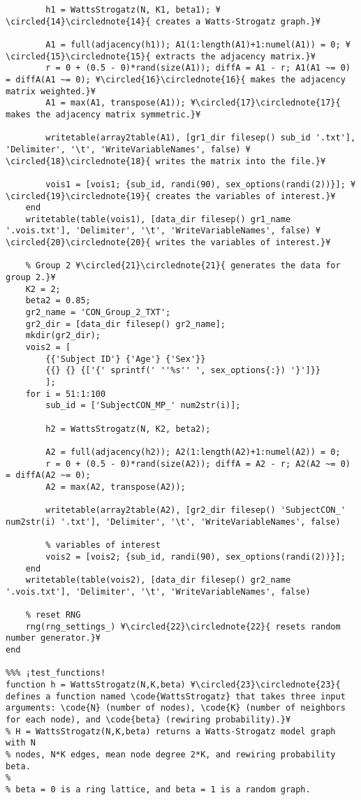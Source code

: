 \documentclass{tufte-handout}
\begin{document}
\begin{lstlisting}
        h1 = WattsStrogatz(N, K1, beta1); ¥\circled{14}\circlednote{14}{ creates a Watts-Strogatz graph.}¥  

        A1 = full(adjacency(h1)); A1(1:length(A1)+1:numel(A1)) = 0; ¥\circled{15}\circlednote{15}{ extracts the adjacency matrix.}¥ 
        r = 0 + (0.5 - 0)*rand(size(A1)); diffA = A1 - r; A1(A1 ~= 0) = diffA(A1 ~= 0); ¥\circled{16}\circlednote{16}{ makes the adjacency matrix weighted.}¥
        A1 = max(A1, transpose(A1)); ¥\circled{17}\circlednote{17}{ makes the adjacency matrix symmetric.}¥

        writetable(array2table(A1), [gr1_dir filesep() sub_id '.txt'], 'Delimiter', '\t', 'WriteVariableNames', false) ¥\circled{18}\circlednote{18}{ writes the matrix into the file.}¥

        vois1 = [vois1; {sub_id, randi(90), sex_options(randi(2))}]; ¥\circled{19}\circlednote{19}{ creates the variables of interest.}¥
    end
    writetable(table(vois1), [data_dir filesep() gr1_name '.vois.txt'], 'Delimiter', '\t', 'WriteVariableNames', false) ¥\circled{20}\circlednote{20}{ writes the variables of interest.}¥

    % Group 2 ¥\circled{21}\circlednote{21}{ generates the data for group 2.}¥  
    K2 = 2; 
    beta2 = 0.85;
    gr2_name = 'CON_Group_2_TXT';
    gr2_dir = [data_dir filesep() gr2_name];
    mkdir(gr2_dir);
    vois2 = [
        {{'Subject ID'} {'Age'} {'Sex'}}
        {{} {} {['{' sprintf(' ''%s'' ', sex_options{:}) '}']}}
        ];
    for i = 51:1:100
        sub_id = ['SubjectCON_MP_' num2str(i)];

        h2 = WattsStrogatz(N, K2, beta2);

        A2 = full(adjacency(h2)); A2(1:length(A2)+1:numel(A2)) = 0;
        r = 0 + (0.5 - 0)*rand(size(A2)); diffA = A2 - r; A2(A2 ~= 0) = diffA(A2 ~= 0);
        A2 = max(A2, transpose(A2));

        writetable(array2table(A2), [gr2_dir filesep() 'SubjectCON_' num2str(i) '.txt'], 'Delimiter', '\t', 'WriteVariableNames', false)

        % variables of interest
        vois2 = [vois2; {sub_id, randi(90), sex_options(randi(2))}];
    end
    writetable(table(vois2), [data_dir filesep() gr2_name '.vois.txt'], 'Delimiter', '\t', 'WriteVariableNames', false)

    % reset RNG
    rng(rng_settings_) ¥\circled{22}\circlednote{22}{ resets random number generator.}¥  
end

%%% ¡test_functions! 
function h = WattsStrogatz(N,K,beta) ¥\circled{23}\circlednote{23}{ defines a function named \code{WattsStrogatz} that takes three input arguments: \code{N} (number of nodes), \code{K} (number of neighbors for each node), and \code{beta} (rewiring probability).}¥
% H = WattsStrogatz(N,K,beta) returns a Watts-Strogatz model graph with N
% nodes, N*K edges, mean node degree 2*K, and rewiring probability beta.
%
% beta = 0 is a ring lattice, and beta = 1 is a random graph.


\end{lstlisting}
\end{document}

